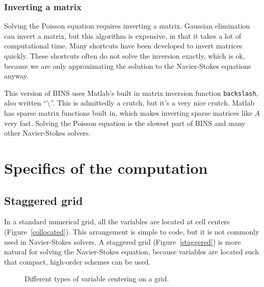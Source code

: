 \documentclass[12pt]{article}
\begin{document}
\subsubsection{Inverting a matrix}
Solving the Poisson equation requires inverting a matrix.  Gaussian elimination can invert a matrix, but this algorithm is expensive, in that it takes a lot of computational time.  Many shortcuts have been developed to invert matrices quickly.  These shortcuts often do not solve the inversion exactly, which is ok, because we are only approximating the solution to the Navier-Stokes equations anyway.

This version of BINS uses Matlab's built in matrix inversion function \texttt{backslash}, also written ``\textbackslash''.  This is admittedly a crutch, but it's a very nice crutch.  Matlab has sparse matrix functions built in, which makes inverting sparse matrices like $A$ very fast.  Solving the Poisson equation is the slowest part of BINS and many other Navier-Stokes solvers.

\section{Specifics of the computation}
\FloatBarrier
\subsection{Staggered grid}
\label{staggeredGrid}
In a standard numerical grid, all the variables are located at cell centers (Figure~\ref{collocated}).  This arrangement is simple to code, but it is not commonly used in Navier-Stokes solvers.  A staggered grid (Figure~\ref{staggered}) is more natural for solving the Navier-Stokes equation, because variables are located such that compact, high-order schemes can be used.

\begin{center}
\begin{figure*}[h]
\center
{}  
\caption{Different types of variable centering on a grid.}
\label{grid_types}
\end{figure*}
\end{center}
\end{document}

